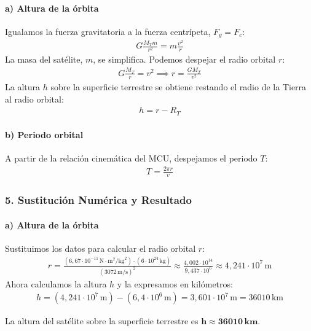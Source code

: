 \paragraph{a) Altura de la órbita}
Igualamos la fuerza gravitatoria a la fuerza centrípeta, $F_g = F_c$:
\begin{gather}
    G \frac{M_T m}{r^2} = m \frac{v^2}{r}
\end{gather}
La masa del satélite, $m$, se simplifica. Podemos despejar el radio orbital $r$:
\begin{gather}
    G \frac{M_T}{r} = v^2 \implies r = \frac{G M_T}{v^2}
\end{gather}
La altura $h$ sobre la superficie terrestre se obtiene restando el radio de la Tierra al radio orbital:
\begin{gather}
    h = r - R_T
\end{gather}

\paragraph{b) Periodo orbital}
A partir de la relación cinemática del MCU, despejamos el periodo $T$:
\begin{gather}
    T = \frac{2\pi r}{v}
\end{gather}

\subsubsection*{5. Sustitución Numérica y Resultado}
\paragraph{a) Altura de la órbita}
Sustituimos los datos para calcular el radio orbital $r$:
\begin{gather}
    r = \frac{(6,67 \cdot 10^{-11} \, \text{N}\cdot\text{m}^2/\text{kg}^2) \cdot (6 \cdot 10^{24} \, \text{kg})}{(3072 \, \text{m/s})^2} \approx \frac{4,002 \cdot 10^{14}}{9,437 \cdot 10^6} \approx 4,241 \cdot 10^7 \, \text{m}
\end{gather}
Ahora calculamos la altura $h$ y la expresamos en kilómetros:
\begin{gather}
    h = (4,241 \cdot 10^7 \, \text{m}) - (6,4 \cdot 10^6 \, \text{m}) = 3,601 \cdot 10^7 \, \text{m} = 36010 \, \text{km}
\end{gather}
\begin{cajaresultado}
    La altura del satélite sobre la superficie terrestre es $\boldsymbol{h \approx 36010 \, \textbf{km}}$.
\end{cajaresultado}

